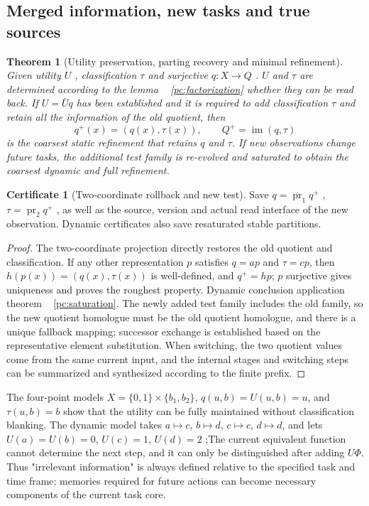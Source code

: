 \documentclass[11pt,a4paper]{article}
\theoremstyle{plain}
\newtheorem{theorem}{Theorem}[section]
\theoremstyle{definition}
\newtheorem*{certificate}{Certificate}
\theoremstyle{remark}
\begin{document}
\begin{CJK*}
\subsection { Merged information, new tasks and true sources }

\begin{theorem}
[Utility preservation, parting recovery and minimal refinement]\label{pc:refinement}
Given utility $U$ , classification $\tau$ and surjective $q:X\to Q$ . $U$ and $\tau$ are determined according to the lemma ~ \ref{pc:factorization} whether they can be read back. If $U=\bar Uq$ has been established and it is required to add classification $\tau$ and retain all the information of the old quotient, then \[
 q^+(x)=(q(x),\tau(x)),\qquad Q^+=\operatorname{im}(q,\tau)
\] is the coarsest static refinement that retains $q$ and $\tau$. If new observations change future tasks, the additional test family is re-evolved and saturated to obtain the coarsest dynamic and full refinement.\end{theorem}
\begin{certificate}
[Two-coordinate rollback and new test]Save $q=\operatorname{pr}_1q^+$ , $\tau=\operatorname{pr}_2q^+$ , as well as the source, version and actual read interface of the new observation. Dynamic certificates also save resaturated stable partitions.\end{certificate}
\begin{proof}
The two-coordinate projection directly restores the old quotient and classification. If any other representation $p$ satisfies $q=ap$ and $\tau=cp$, then $h(p(x))=(q(x),\tau(x))$ is well-defined, and $q^+=hp$; $p$ surjective gives uniqueness and proves the roughest property. Dynamic conclusion application theorem ~ \ref{pc:saturation}. The newly added test family includes the old family, so the new quotient homologue must be the old quotient homologue, and there is a unique fallback mapping; successor exchange is established based on the representative element substitution. When switching, the two quotient values come from the same current input, and the internal stages and switching steps can be summarized and synthesized according to the finite prefix.\end{proof}


The four-point models $X=\{0,1\}\times\{b_1,b_2\}$, $q(u,b)=U(u,b)=u$, and $\tau(u,b)=b$ show that the utility can be fully maintained without classification blanking. The dynamic model takes $a\mapsto c$, $b\mapsto d$, $c\mapsto c$, $d\mapsto d$, and lets $U(a)=U(b)=0$, $U(c)=1$, $U(d)=2$ ;The current equivalent function cannot determine the next step, and it can only be distinguished after adding $U\Phi$. Thus "irrelevant information" is always defined relative to the specified task and time frame; memories required for future actions can become necessary components of the current task core.


\end{CJK*}
\end{document}
